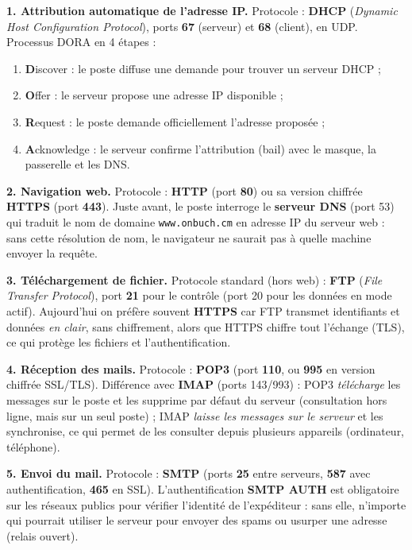 \documentclass[11pt]{article}
\begin{document}
\begin{corrige}

\textbf{1. Attribution automatique de l'adresse IP.} Protocole : \textbf{DHCP} (\emph{Dynamic Host Configuration Protocol}), ports \textbf{67} (serveur) et \textbf{68} (client), en UDP. Processus DORA en 4 étapes :
\begin{enumerate}
    \item \textbf{D}iscover : le poste diffuse une demande pour trouver un serveur DHCP ;
    \item \textbf{O}ffer : le serveur propose une adresse IP disponible ;
    \item \textbf{R}equest : le poste demande officiellement l'adresse proposée ;
    \item \textbf{A}cknowledge : le serveur confirme l'attribution (bail) avec le masque, la passerelle et les DNS.
\end{enumerate}

\textbf{2. Navigation web.} Protocole : \textbf{HTTP} (port \textbf{80}) ou sa version chiffrée \textbf{HTTPS} (port \textbf{443}). Juste avant, le poste interroge le \textbf{serveur DNS} (port 53) qui traduit le nom de domaine \texttt{www.onbuch.cm} en adresse IP du serveur web : sans cette résolution de nom, le navigateur ne saurait pas à quelle machine envoyer la requête.

\textbf{3. Téléchargement de fichier.} Protocole standard (hors web) : \textbf{FTP} (\emph{File Transfer Protocol}), port \textbf{21} pour le contrôle (port 20 pour les données en mode actif). Aujourd'hui on préfère souvent \textbf{HTTPS} car FTP transmet identifiants et données \emph{en clair}, sans chiffrement, alors que HTTPS chiffre tout l'échange (TLS), ce qui protège les fichiers et l'authentification.

\textbf{4. Réception des mails.} Protocole : \textbf{POP3} (port \textbf{110}, ou \textbf{995} en version chiffrée SSL/TLS). Différence avec \textbf{IMAP} (ports 143/993) : POP3 \emph{télécharge} les messages sur le poste et les supprime par défaut du serveur (consultation hors ligne, mais sur un seul poste) ; IMAP \emph{laisse les messages sur le serveur} et les synchronise, ce qui permet de les consulter depuis plusieurs appareils (ordinateur, téléphone).

\textbf{5. Envoi du mail.} Protocole : \textbf{SMTP} (ports \textbf{25} entre serveurs, \textbf{587} avec authentification, \textbf{465} en SSL). L'authentification \textbf{SMTP AUTH} est obligatoire sur les réseaux publics pour vérifier l'identité de l'expéditeur : sans elle, n'importe qui pourrait utiliser le serveur pour envoyer des spams ou usurper une adresse (relais ouvert).


\end{corrige}
\end{document}
